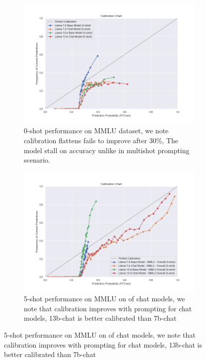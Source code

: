 \documentclass[11pt]{article}
\begin{document}
\begin{figure}
     \centering
     \begin{subfigure}[b]{0.49\textwidth}
         \centering \includegraphics[width=1.3\textwidth]{figures/0-shot-MMLU.png}
         \caption{0-shot performance on MMLU dataset, we note calibration flattens fails to improve after 30\%, The model stall on accuracy unlike in multishot prompting scenario.}
         \label{fig:0-shot-MMLU}
     \end{subfigure}
     \hfill
     \begin{subfigure}[b]{0.49\textwidth}
         \centering
         \includegraphics[width=1.3\textwidth]{figures/5-shot-MMLU.png}
         \caption{5-shot performance on MMLU on of chat models, we note that calibration improves with prompting for chat models, 13b-chat is better calibrated than 7b-chat}
         \label{fig:5-shot-logicqa}
     \end{subfigure}     
     

\end{figure}
\end{document}
